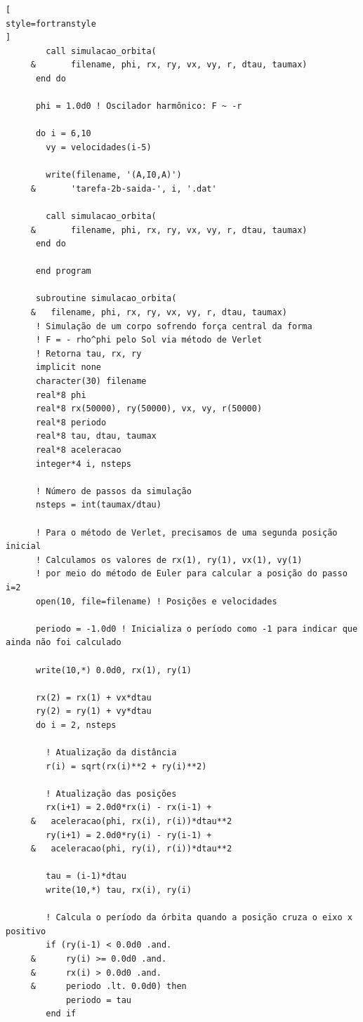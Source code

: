 \documentclass[12pt,a4paper]{article}
\begin{document}
\begin{lstlisting}[
style=fortranstyle
]
        call simulacao_orbita(
     &       filename, phi, rx, ry, vx, vy, r, dtau, taumax)
      end do

      phi = 1.0d0 ! Oscilador harmônico: F ~ -r

      do i = 6,10
        vy = velocidades(i-5)

        write(filename, '(A,I0,A)')
     &       'tarefa-2b-saida-', i, '.dat'

        call simulacao_orbita(
     &       filename, phi, rx, ry, vx, vy, r, dtau, taumax)
      end do

      end program

      subroutine simulacao_orbita(
     &   filename, phi, rx, ry, vx, vy, r, dtau, taumax)
      ! Simulação de um corpo sofrendo força central da forma 
      ! F = - rho^phi pelo Sol via método de Verlet
      ! Retorna tau, rx, ry
      implicit none
      character(30) filename
      real*8 phi
      real*8 rx(50000), ry(50000), vx, vy, r(50000)
      real*8 periodo
      real*8 tau, dtau, taumax
      real*8 aceleracao
      integer*4 i, nsteps

      ! Número de passos da simulação
      nsteps = int(taumax/dtau)

      ! Para o método de Verlet, precisamos de uma segunda posição inicial
      ! Calculamos os valores de rx(1), ry(1), vx(1), vy(1)
      ! por meio do método de Euler para calcular a posição do passo i=2
      open(10, file=filename) ! Posições e velocidades

      periodo = -1.0d0 ! Inicializa o período como -1 para indicar que ainda não foi calculado

      write(10,*) 0.0d0, rx(1), ry(1)

      rx(2) = rx(1) + vx*dtau
      ry(2) = ry(1) + vy*dtau
      do i = 2, nsteps

        ! Atualização da distância
        r(i) = sqrt(rx(i)**2 + ry(i)**2)

        ! Atualização das posições
        rx(i+1) = 2.0d0*rx(i) - rx(i-1) +
     &   aceleracao(phi, rx(i), r(i))*dtau**2
        ry(i+1) = 2.0d0*ry(i) - ry(i-1) +
     &   aceleracao(phi, ry(i), r(i))*dtau**2

        tau = (i-1)*dtau
        write(10,*) tau, rx(i), ry(i)

        ! Calcula o período da órbita quando a posição cruza o eixo x positivo
        if (ry(i-1) < 0.0d0 .and.
     &      ry(i) >= 0.0d0 .and.
     &      rx(i) > 0.0d0 .and.
     &      periodo .lt. 0.0d0) then
            periodo = tau
        end if


\end{lstlisting}
\end{document}
